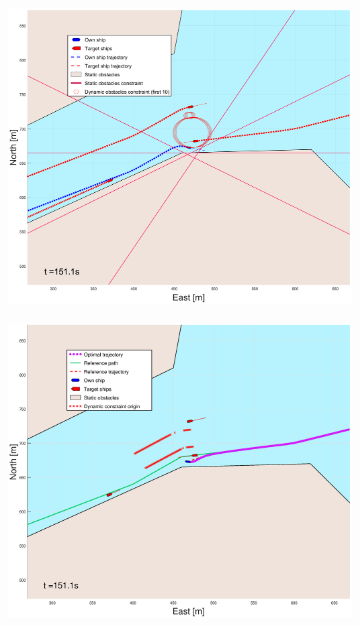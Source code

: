 \begin{figure}[!b]
\begin{subfigure}[b]{0.499\textwidth}
    \end{subfigure}
    \hfill
    \\
    \begin{subfigure}[b]{0.49\textwidth}
        \centering
        \includegraphics[width=\textwidth]{Images/Figures/Trheimfjord/_Simple_0fig1_time=151}
    \end{subfigure}
    \hfill
    \begin{subfigure}[b]{0.499\textwidth}
        \centering
        \includegraphics[width=\textwidth]{Images/Figures/Trheimfjord/_Simple_0fig999_time=151}
    \end{subfigure}
    \hfill
\end{figure}%
